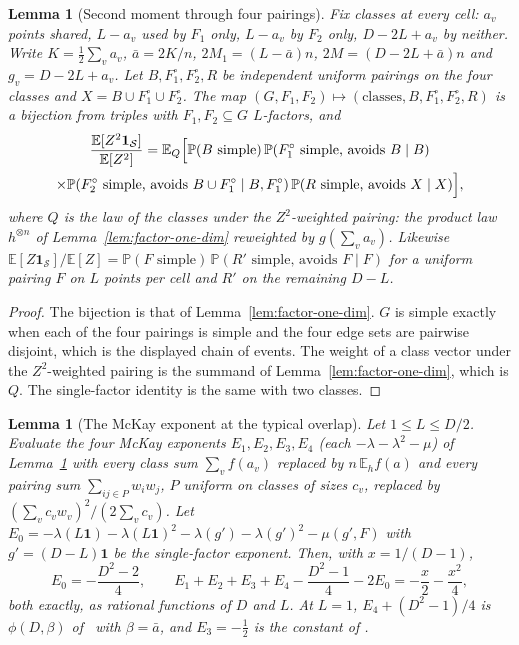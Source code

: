 \documentclass[11pt]{article}
\newtheorem{lemma}[theorem]{Lemma}
\newcommand{\EE}{\mathbb{E}}
\newcommand{\PP}{\mathbb{P}}
\begin{document}
\begin{lemma}[Second moment through four pairings]
\label{lem:four-pairings}
Fix classes at every cell: \(a_v\) points shared, \(L-a_v\) used by \(F_1\)
only, \(L-a_v\) by \(F_2\) only, \(D-2L+a_v\) by neither. Write
\(K=\tfrac12\sum_v a_v\), \(\bar a=2K/n\), \(2M_1=(L-\bar a)n\),
\(2M=(D-2L+\bar a)n\) and \(g_v=D-2L+a_v\). Let
\(B,F_1^\circ,F_2^\circ,R\) be independent uniform pairings on the four
classes and \(X=B\cup F_1^\circ\cup F_2^\circ\). The map
\((G,F_1,F_2)\mapsto(\text{classes},B,F_1^\circ,F_2^\circ,R)\) is a bijection
from triples with \(F_1,F_2\subseteq G\) \(L\)-factors, and
\begin{multline*}
\frac{\EE[Z^2\mathbf 1_{\mathcal S}]}{\EE[Z^2]}
=
\EE_Q\Bigl[\PP(B\text{ simple})\,
\PP(F_1^\circ\text{ simple, avoids }B\mid B)
\\
\times\PP(F_2^\circ\text{ simple, avoids }B\cup F_1^\circ\mid B,F_1^\circ)\,
\PP(R\text{ simple, avoids }X\mid X)\Bigr],
\end{multline*}
where \(Q\) is the law of the classes under the \(Z^2\)-weighted pairing:
the product law \(h^{\otimes n}\) of Lemma~\ref{lem:factor-one-dim}
reweighted by \(g(\sum_v a_v)\). Likewise
\(\EE[Z\mathbf 1_{\mathcal S}]/\EE[Z]=\PP(F\text{ simple})\,
\PP(R'\text{ simple, avoids }F\mid F)\) for a uniform pairing \(F\) on \(L\)
points per cell and \(R'\) on the remaining \(D-L\).
\end{lemma}

\begin{proof}
The bijection is that of Lemma~\ref{lem:factor-one-dim}. \(G\) is simple
exactly when each of the four pairings is simple and the four edge sets are
pairwise disjoint, which is the displayed chain of events. The weight of a
class vector under the \(Z^2\)-weighted pairing is the summand of
Lemma~\ref{lem:factor-one-dim}, which is \(Q\). The single-factor identity
is the same with two classes.
\end{proof}

\begin{lemma}[The McKay exponent at the typical overlap]
\label{lem:mckay-exponent}
Let \(1\le L\le D/2\). Evaluate the four McKay exponents
\(E_1,E_2,E_3,E_4\) (each \(-\lambda-\lambda^2-\mu\)) of
Lemma~\ref{lem:four-pairings} with every class sum \(\sum_v f(a_v)\)
replaced by \(n\,\EE_h f(a)\) and every pairing sum
\(\sum_{ij\in P}w_iw_j\), \(P\) uniform on classes of sizes \(c_v\), replaced
by \((\sum_v c_vw_v)^2/(2\sum_v c_v)\). Let
\(E_0=-\lambda(L\mathbf 1)-\lambda(L\mathbf 1)^2-\lambda(g')-\lambda(g')^2-\mu(g',F)\)
with \(g'=(D-L)\mathbf 1\) be the single-factor exponent. Then, with
\(x=1/(D-1)\),
\[
E_0=-\frac{D^2-2}{4},
\qquad
E_1+E_2+E_3+E_4-\frac{D^2-1}{4}-2E_0
=
-\frac x2-\frac{x^2}{4},
\]
both exactly, as rational functions of \(D\) and \(L\). At \(L=1\),
\(E_4+(D^2-1)/4\) is \(\phi(D,\beta)\) of~\cite[eq.~(8)]{Gao21} with
\(\beta=\bar a\), and \(E_3=-\tfrac12\) is the constant of
\cite[Lemma~17]{Gao21}.
\end{lemma}
\end{document}
